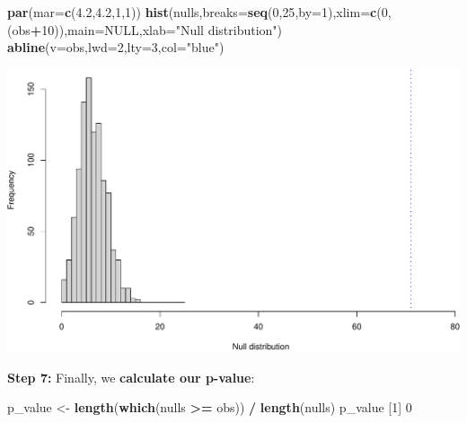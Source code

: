 \documentclass[
]{book}
\newenvironment{Shaded}{\begin{snugshade}}{\end{snugshade}}
\newcommand{\DataTypeTok}[1]{\textcolor[rgb]{0.13,0.29,0.53}{#1}}
\newcommand{\DecValTok}[1]{\textcolor[rgb]{0.00,0.00,0.81}{#1}}
\newcommand{\FloatTok}[1]{\textcolor[rgb]{0.00,0.00,0.81}{#1}}
\newcommand{\KeywordTok}[1]{\textcolor[rgb]{0.13,0.29,0.53}{\textbf{#1}}}
\newcommand{\NormalTok}[1]{#1}
\newcommand{\OperatorTok}[1]{\textcolor[rgb]{0.81,0.36,0.00}{\textbf{#1}}}
\newcommand{\OtherTok}[1]{\textcolor[rgb]{0.56,0.35,0.01}{#1}}
\newcommand{\StringTok}[1]{\textcolor[rgb]{0.31,0.60,0.02}{#1}}
\begin{document}
\begin{Shaded}
\begin{Highlighting}[]
\KeywordTok{par}\NormalTok{(}\DataTypeTok{mar=}\KeywordTok{c}\NormalTok{(}\FloatTok{4.2}\NormalTok{,}\FloatTok{4.2}\NormalTok{,}\DecValTok{1}\NormalTok{,}\DecValTok{1}\NormalTok{))}
\KeywordTok{hist}\NormalTok{(nulls,}\DataTypeTok{breaks=}\KeywordTok{seq}\NormalTok{(}\DecValTok{0}\NormalTok{,}\DecValTok{25}\NormalTok{,}\DataTypeTok{by=}\DecValTok{1}\NormalTok{),}\DataTypeTok{xlim=}\KeywordTok{c}\NormalTok{(}\DecValTok{0}\NormalTok{,(obs}\OperatorTok{+}\DecValTok{10}\NormalTok{)),}\DataTypeTok{main=}\OtherTok{NULL}\NormalTok{,}\DataTypeTok{xlab=}\StringTok{"Null distribution"}\NormalTok{)}
\KeywordTok{abline}\NormalTok{(}\DataTypeTok{v=}\NormalTok{obs,}\DataTypeTok{lwd=}\DecValTok{2}\NormalTok{,}\DataTypeTok{lty=}\DecValTok{3}\NormalTok{,}\DataTypeTok{col=}\StringTok{"blue"}\NormalTok{)}
\end{Highlighting}
\end{Shaded}

\includegraphics{figures/unnamed-chunk-455-1.pdf}

\textbf{Step 7:} Finally, we \textbf{calculate our p-value}:

\begin{Shaded}
\begin{Highlighting}[]
\NormalTok{p_value <-}\StringTok{ }\KeywordTok{length}\NormalTok{(}\KeywordTok{which}\NormalTok{(nulls }\OperatorTok{>=}\StringTok{ }\NormalTok{obs)) }\OperatorTok{/}\StringTok{ }\KeywordTok{length}\NormalTok{(nulls)}
\NormalTok{p_value}
\NormalTok{[}\DecValTok{1}\NormalTok{] }\DecValTok{0}
\end{Highlighting}
\end{Shaded}
\end{document}
